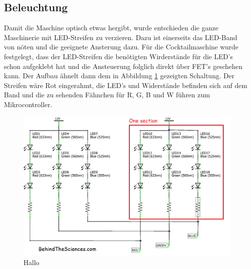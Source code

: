 \newpage
\subsection{Beleuchtung}
\label{subsec:Beleuchtung}

Damit die Maschine optisch etwas hergibt, wurde entschieden die ganze Maschinerie mit LED-Streifen zu verzieren. Dazu ist einerseits das LED-Band von nöten und die geeignete Ansterung dazu. Für die Cocktailmaschine wurde festgelegt, dass der LED-Streifen die benötigten Wirderstände für die LED's schon aufgeklebt hat und die Ansteuerung folglich direkt über FET's geschehen kann. Der Aufbau ähnelt dann dem in Abbildung \ref{fig:LED1} gezeigten Schaltung. Der Streifen wäre Rot eingerahmt, die LED's und Widerstände befinden sich auf dem Band und die zu sehenden Fähnchen für R, G, B und W führen zum Mikrocontroller.

\begin{figure}[h!]
\center
\includegraphics[width = \textwidth]{graphics/Schema_LED1}
\caption{Hallo}
\label{fig:LED1}
\end{figure}